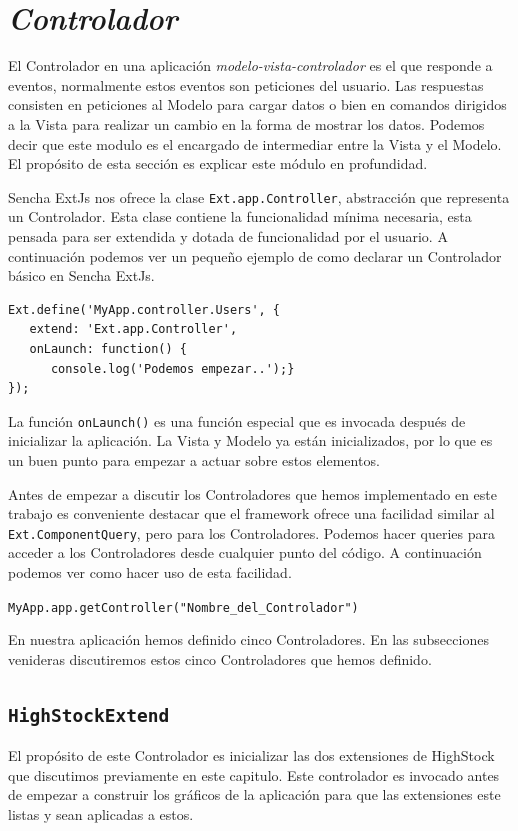 \section{\emph{Controlador}}
	El Controlador en una aplicación \emph{modelo-vista-controlador}\cite{MVCWiki} es el que responde a eventos, normalmente estos eventos son
	peticiones del usuario. Las respuestas consisten en peticiones al Modelo para cargar datos o bien en comandos dirigidos a la Vista para
	realizar un cambio en la forma de mostrar los datos. Podemos decir que este modulo es el encargado de intermediar entre la Vista y el Modelo.
	El propósito de esta sección es explicar este módulo en profundidad.
	\par
	Sencha ExtJs nos ofrece la clase \texttt{Ext.app.Controller}, abstracción que representa un Controlador. Esta clase contiene la funcionalidad
	mínima necesaria, esta pensada para ser extendida y dotada de funcionalidad por el usuario. A continuación podemos ver un pequeño ejemplo de
	como declarar un Controlador básico en Sencha ExtJs.
	\begin{lstlisting}
Ext.define('MyApp.controller.Users', {
   extend: 'Ext.app.Controller',
   onLaunch: function() {
      console.log('Podemos empezar..');}
});
	\end{lstlisting}
	La función \texttt{onLaunch()} es una función especial que es invocada después de inicializar la aplicación. La Vista y Modelo ya están
	inicializados, por lo que es un buen punto para empezar a actuar sobre estos elementos.
	\par
	Antes de empezar a discutir los Controladores que hemos implementado en este trabajo es conveniente destacar que el framework ofrece una
	facilidad similar al \texttt{Ext.ComponentQuery}, pero para los Controladores. Podemos hacer queries para acceder a los Controladores desde
	cualquier punto del código. A continuación podemos ver como hacer uso de esta facilidad.
    		\begin{center} \texttt{MyApp.app.getController("Nombre\_del\_Controlador")}  \end{center}
	\par
	En nuestra aplicación hemos definido cinco Controladores. En las subsecciones venideras discutiremos estos cinco Controladores que hemos
	definido.
	\subsection{\texttt{HighStockExtend}}
		El propósito de este Controlador es inicializar las dos extensiones de HighStock que discutimos previamente en este capitulo. Este controlador es
		invocado antes de empezar a construir los gráficos de la aplicación para que las extensiones este listas y sean aplicadas a estos.
